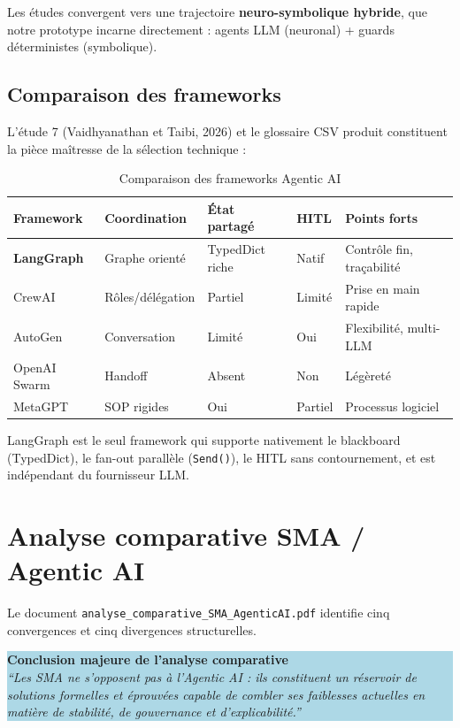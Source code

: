 \documentclass[12pt,a4paper]{report}
\begin{document}
Les études convergent vers une trajectoire \textbf{neuro-symbolique hybride}, que
notre prototype incarne directement : agents LLM (neuronal) + guards déterministes
(symbolique).

\subsection{Comparaison des frameworks}

L'étude 7 (Vaidhyanathan et Taibi, 2026) et le glossaire CSV produit constituent
la pièce maîtresse de la sélection technique :

\begin{table}[H]
\centering
\caption{Comparaison des frameworks Agentic AI}
\label{tab:frameworks}
\begin{tabularx}{\textwidth}{L{2.3cm}L{2.5cm}C{1.8cm}C{1.5cm}L{3.8cm}}
\toprule
\textbf{Framework} & \textbf{Coordination} & \textbf{État partagé} & \textbf{HITL} & \textbf{Points forts} \\
\midrule
{}
\textbf{LangGraph} & Graphe orienté & TypedDict riche & Natif & Contrôle fin, traçabilité \\
CrewAI & Rôles/délégation & Partiel & Limité & Prise en main rapide \\
AutoGen & Conversation & Limité & Oui & Flexibilité, multi-LLM \\
OpenAI Swarm & Handoff & Absent & Non & Légèreté \\
MetaGPT & SOP rigides & Oui & Partiel & Processus logiciel \\
\bottomrule
\end{tabularx}
\end{table}

LangGraph est le seul framework qui supporte nativement le blackboard (TypedDict),
le fan-out parallèle (\texttt{Send()}), le HITL sans contournement, et est
indépendant du fournisseur LLM.

\section{Analyse comparative SMA / Agentic AI}

Le document \texttt{analyse\_comparative\_SMA\_AgenticAI.pdf} identifie cinq
convergences et cinq divergences structurelles.

\medskip
\colorbox{lightblue}{\parbox{0.95\textwidth}{\smallskip
\textbf{\color{primary}Conclusion majeure de l'analyse comparative}\\
\textit{``Les SMA ne s'opposent pas à l'Agentic AI : ils constituent un réservoir
de solutions formelles et éprouvées capable de combler ses faiblesses actuelles
en matière de stabilité, de gouvernance et d'explicabilité.''}
\smallskip}}
\medskip
\end{document}
